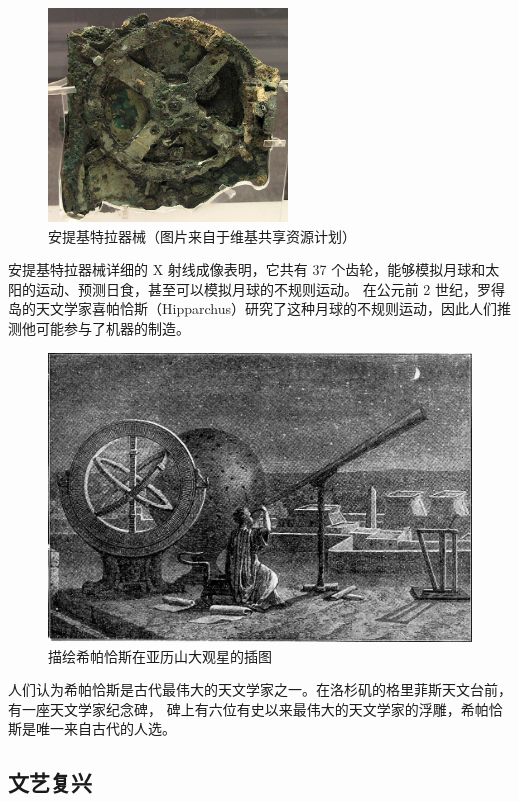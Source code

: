 \documentclass[a4paper,10.5pt]{book}
\begin{document}
\begin{figure}[ht]
\centering
\includegraphics[width=2.5in]{images/1_03-Antikythera.jpg}
\caption{安提基特拉器械（图片来自于维基共享资源计划）}
\end{figure}

安提基特拉器械详细的 X 射线成像表明，它共有 37 个齿轮，能够模拟月球和太阳的运动、预测日食，甚至可以模拟月球的不规则运动。
在公元前 2 世纪，罗得岛的天文学家喜帕恰斯（Hipparchus）研究了这种月球的不规则运动，因此人们推测他可能参与了机器的制造。

\begin{figure}[ht]
\centering
\includegraphics[width=5.0in]{images/1_03-Observatory_in_Alexandria_at_the_Time_of_Hipparchus.jpg}
\caption{描绘希帕恰斯在亚历山大观星的插图}
\end{figure}

人们认为希帕恰斯是古代最伟大的天文学家之一。在洛杉矶的格里菲斯天文台前，有一座天文学家纪念碑，
碑上有六位有史以来最伟大的天文学家的浮雕，希帕恰斯是唯一来自古代的人选。

\subsection{文艺复兴}
\end{document}
